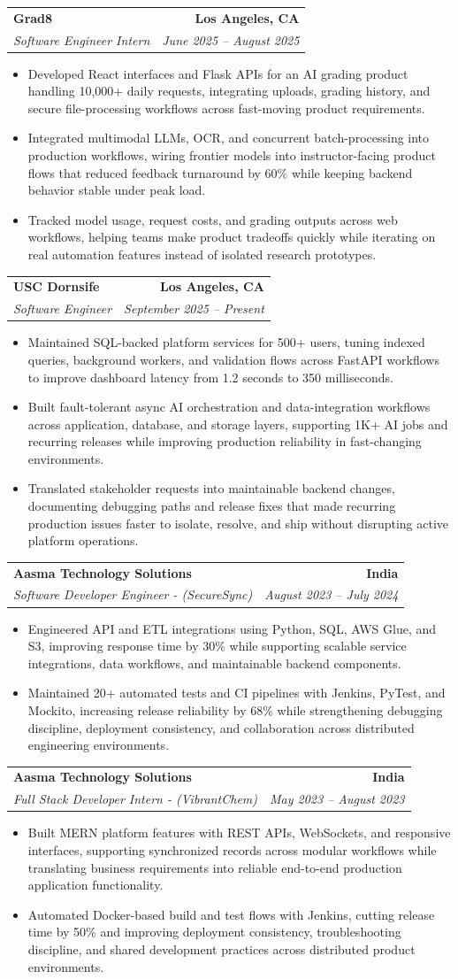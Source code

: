 \documentclass[letterpaper,10pt]{article}
\makeatletter
\newcommand{\resumeItem}[1]{\item\small{{#1 \vspace{-2pt}}}}
\newcommand{\resumeSubheading}[4]{\vspace{-1pt}\item\begin{tabular*}{1.0\textwidth}[t]{l@{\extracolsep{\fill}}r}\textbf{#1} & \textbf{\small #2} \\\textit{\small#3} & \textit{\small #4} \\\end{tabular*}\vspace{-2pt}}
\newcommand{\resumeItemListStart}{\begin{itemize}[leftmargin=0.15in,label=\textbullet,itemsep=2pt,topsep=0pt,parsep=0pt,partopsep=0pt]}
\newcommand{\resumeItemListEnd}{\end{itemize}\vspace{-4pt}}
\makeatother
\begin{document}
\resumeSubheading{Grad8}{Los Angeles, CA}{Software Engineer Intern}{June 2025 -- August 2025}
\resumeItemListStart
\resumeItem{Developed React interfaces and Flask APIs for an AI grading product handling 10,000+ daily requests, integrating uploads, grading history, and secure file-processing workflows across fast-moving product requirements.}
\resumeItem{Integrated multimodal LLMs, OCR, and concurrent batch-processing into production workflows, wiring frontier models into instructor-facing product flows that reduced feedback turnaround by 60\% while keeping backend behavior stable under peak load.}
\resumeItem{Tracked model usage, request costs, and grading outputs across web workflows, helping teams make product tradeoffs quickly while iterating on real automation features instead of isolated research prototypes.}
\resumeItemListEnd

\resumeSubheading{USC Dornsife}{Los Angeles, CA}{Software Engineer}{September 2025 -- Present}
\resumeItemListStart
\resumeItem{Maintained SQL-backed platform services for 500+ users, tuning indexed queries, background workers, and validation flows across FastAPI workflows to improve dashboard latency from 1.2 seconds to 350 milliseconds.}
\resumeItem{Built fault-tolerant async AI orchestration and data-integration workflows across application, database, and storage layers, supporting 1K+ AI jobs and recurring releases while improving production reliability in fast-changing environments.}
\resumeItem{Translated stakeholder requests into maintainable backend changes, documenting debugging paths and release fixes that made recurring production issues faster to isolate, resolve, and ship without disrupting active platform operations.}
\resumeItemListEnd

\resumeSubheading{Aasma Technology Solutions}{India}{Software Developer Engineer - (SecureSync)}{August 2023 -- July 2024}
\resumeItemListStart
\resumeItem{Engineered API and ETL integrations using Python, SQL, AWS Glue, and S3, improving response time by 30\% while supporting scalable service integrations, data workflows, and maintainable backend components.}
\resumeItem{Maintained 20+ automated tests and CI pipelines with Jenkins, PyTest, and Mockito, increasing release reliability by 68\% while strengthening debugging discipline, deployment consistency, and collaboration across distributed engineering environments.}
\resumeItemListEnd

\resumeSubheading{Aasma Technology Solutions}{India}{Full Stack Developer Intern - (VibrantChem)}{May 2023 -- August 2023}
\resumeItemListStart
\resumeItem{Built MERN platform features with REST APIs, WebSockets, and responsive interfaces, supporting synchronized records across modular workflows while translating business requirements into reliable end-to-end production application functionality.}
\resumeItem{Automated Docker-based build and test flows with Jenkins, cutting release time by 50\% and improving deployment consistency, troubleshooting discipline, and shared development practices across distributed product environments.}
\resumeItemListEnd
\end{document}

